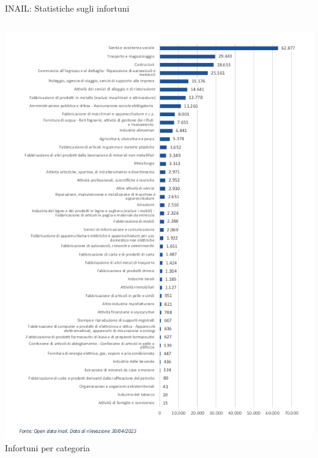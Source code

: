 \documentclass{beamer}
\begin{document}
\begin{frame}{INAIL: Statistiche sugli infortuni}
\begin{columns}
\begin{column}{0.25\textwidth}
      \includegraphics[width=\textwidth]{images/infortuni_industria_e_servizi.png}
      \vspace{2mm}
      \small{Infortuni per categoria}
    \end{column}
  \end{columns}
\end{frame}
\end{document}

